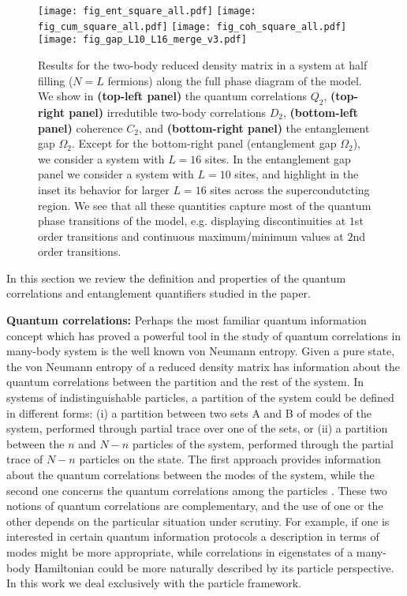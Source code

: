 \documentclass[prb,reprint,showpacs,twocolumn,superscriptaddress]{revtex4-2}
\begin{document}
\begin{figure*}
\centering
\texttt{[image: fig\_ent\_square\_all.pdf]}
\texttt{[image: fig\_cum\_square\_all.pdf]}
\texttt{[image: fig\_coh\_square\_all.pdf]}
\texttt{[image: fig\_gap\_L10\_L16\_merge\_v3.pdf]}
\caption{ Results for the two-body reduced density matrix in a system at half filling ($N=L$ fermions) along the full phase diagram of the model. We show in \textbf{(top-left panel)} the quantum correlations $Q_2$, \textbf{(top-right panel)} irredutible two-body correlations $D_2$,
\textbf{(bottom-left panel)} coherence $C_2$, and 
\textbf{(bottom-right panel)} the entanglement gap $\Omega_2$. 
Except for the bottom-right panel (entanglement gap $\Omega_2$), we consider a system with $L=16$ sites. In the entanglement gap panel we consider a system with $L=10$ sites, and highlight in the inset its behavior for larger $L=16$ sites across the supercondutcting region.
 We see that all these quantities capture most of the quantum phase transitions of the model, e.g. displaying discontinuities at $1$st order transitions and continuous maximum/minimum values at $2$nd order transitions.
}
\label{phase.diagram.q2}
\end{figure*}

In this section we review the definition and properties of the quantum correlations and 
entanglement quantifiers studied in the paper.

\textbf{Quantum correlations:} Perhaps the most familiar quantum information concept 
which has proved a powerful tool in the study of quantum correlations in many-body system 
is the well known von Neumann entropy.
Given a pure state, the von Neumann entropy of a reduced density matrix has information 
about the quantum correlations between the partition and the rest of the system. 
In systems of indistinguishable particles, 
a partition of the system could be defined in different forms: 
(i) a partition between two sets A and B of modes of the system, 
performed through partial trace over one of the sets, or 
(ii) a partition between the $n$ and $N-n$ particles of the system, 
performed through the partial trace of $N-n$ particles on the state.
The first approach provides information about the quantum correlations between the modes of the system, 
while the second one concerns the quantum correlations among the particles
\cite{iemini13b,iemini13a,iemini14,balachandran1,balachandran2,ghirardi02,ghirardi04,schliemann01a,schliemann01b,eckert02,li01,barnum04,somma04,paskauskas01,plastino09,zander10,Debarba2017,ding2020,ding2021}.
These two notions of quantum correlations are complementary, 
and the use of one or the other depends on the particular situation under scrutiny. 
For example, if one is interested in certain quantum information protocols a description in terms of 
modes might be more appropriate, 
while correlations in eigenstates of a many-body Hamiltonian could be more naturally described by its 
particle perspective.
In this work we deal exclusively with the particle framework.
\end{document}
